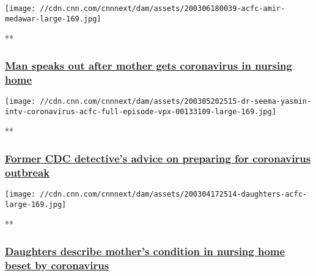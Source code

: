 \href{/videos/us/2020/03/06/mother-coronavirus-life-care-center-acfc-full-episode-vpx.cnn/video/playlists/acfc-full-episodes/}{}

\texttt{[image: //cdn.cnn.com/cnnnext/dam/assets/200306180039-acfc-amir-medawar-large-169.jpg]}

**

\hypertarget{man-speaks-out-after-mother-gets-coronavirus-in-nursing-home}{%
\subsubsection{\texorpdfstring{\href{/videos/us/2020/03/06/mother-coronavirus-life-care-center-acfc-full-episode-vpx.cnn/video/playlists/acfc-full-episodes/}{Man
speaks out after mother gets coronavirus in nursing
home}}{Man speaks out after mother gets coronavirus in nursing home}}\label{man-speaks-out-after-mother-gets-coronavirus-in-nursing-home}}

\href{/videos/us/2020/03/05/dr-seema-yasmin-intv-coronavirus-acfc-full-episode-vpx.cnn/video/playlists/acfc-full-episodes/}{}

\texttt{[image: //cdn.cnn.com/cnnnext/dam/assets/200305202515-dr-seema-yasmin-intv-coronavirus-acfc-full-episode-vpx-00133109-large-169.jpg]}

**

\hypertarget{former-cdc-detectives-advice-on-preparing-for-coronavirus-outbreak}{%
\subsubsection{\texorpdfstring{\href{/videos/us/2020/03/05/dr-seema-yasmin-intv-coronavirus-acfc-full-episode-vpx.cnn/video/playlists/acfc-full-episodes/}{Former
CDC detective's advice on preparing for coronavirus
outbreak}}{Former CDC detective's advice on preparing for coronavirus outbreak}}\label{former-cdc-detectives-advice-on-preparing-for-coronavirus-outbreak}}

\href{/videos/us/2020/03/04/daughters-of-patient-life-care-center-washington-acfc-full-episode-vpx.cnn/video/playlists/acfc-full-episodes/}{}

\texttt{[image: //cdn.cnn.com/cnnnext/dam/assets/200304172514-daughters-acfc-large-169.jpg]}

**

\hypertarget{daughters-describe-mothers-condition-in-nursing-home-beset-by-coronavirus}{%
\subsubsection{\texorpdfstring{\href{/videos/us/2020/03/04/daughters-of-patient-life-care-center-washington-acfc-full-episode-vpx.cnn/video/playlists/acfc-full-episodes/}{Daughters
describe mother's condition in nursing home beset by
coronavirus}}{Daughters describe mother's condition in nursing home beset by coronavirus}}\label{daughters-describe-mothers-condition-in-nursing-home-beset-by-coronavirus}}

